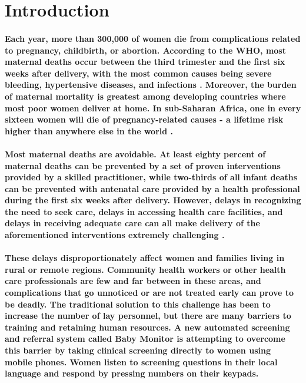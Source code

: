 \section{Introduction}
\paragraph{Each year, more than 300,000 of women die from complications related to pregnancy, childbirth, or abortion. According to the WHO, most maternal deaths occur between the third trimester and the first six weeks after delivery, with the most common causes being severe bleeding, hypertensive diseases, and infections \citep{WHO2012}. Moreover, the burden of maternal mortality is greatest among developing countries where most poor women deliver at home. In sub-Saharan Africa, one in every sixteen women will die of pregnancy-related causes - a lifetime risk higher than anywhere else in the world \citep{Ronsmans2006}.}

\paragraph{Most maternal deaths are avoidable. At least eighty percent of maternal deaths can be prevented by a set of proven interventions provided by a skilled practitioner, while two-thirds of all infant deaths can be prevented with antenatal care provided by a health professional during the first six weeks after delivery. However, delays in recognizing the need to seek care, delays in accessing  health care facilities, and delays in receiving adequate care can all make delivery of the aforementioned interventions extremely challenging \citep{Thaddeus1994}.}

\paragraph{These delays disproportionately affect women and families living in rural or remote regions. Community health workers or other health care professionals are few and far between in these areas, and complications that go unnoticed or are not treated early can prove to be deadly. The traditional solution to this challenge has been to increase the number of lay personnel, but there are many barriers to training and retaining human resources. A new automated screening and referral system called Baby Monitor is attempting to overcome this barrier by taking clinical screening directly to women using mobile phones. Women listen to screening questions in their local language and respond by pressing numbers on their keypads. }

